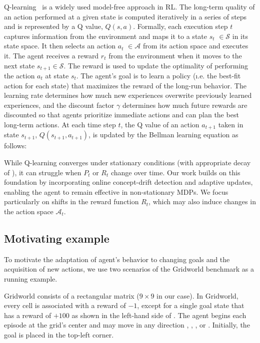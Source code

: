 Q-learning~\cite{watkins92} is a widely used model-free approach in \ac{RL}. The long-term quality of an action performed at a given state is computed iteratively in a series of steps and is represented by a Q value,
$\mathit{Q(s,a)}$.
Formally, each execution step $t$ captures information from the environment and maps it to a state
{\color{purple}$s_t$} $\in \mathcal{S}$ in its state space. It then selects an
action {\color{purple}$a_t$} $\in \mathcal{A}$ from its action space and executes it. The agent
receives a reward {\color{Bittersweet}$r_t$} from the environment when it moves to the next state
$s_{t+1} \in \mathcal{S}$. The reward is used to update the optimality of performing the
action {\color{Mulberry}$a_t$} at state {\color{purple}$s_t$}. The agent's goal is to learn
a policy (\i.e. the best-fit action for each state) that maximizes the reward of the
long-run behavior. The learning rate \lrate{\alpha} determines how much new experiences 
overwrite previously learned experiences, and the discount factor {\color{RoyalBlue} $\gamma$} 
determines how much future rewards are discounted so that agents prioritize immediate actions and 
can plan the best long-term actions. At each time step $t$, the Q value of an action 
{\color{purple}$a_{t+1}$} taken in state {\color{purple}$s_{t+1}$}, $Q(s_{t+1}, a_{t+1})$, is updated by 
the Bellman learning equation as follows:

\vspace{1em}

\vspace{1em}

While Q-learning converges under stationary conditions (with appropriate decay of \lrate{\alpha}), it 
can struggle when $P_t$ or $R_t$ change over time. Our work builds on this foundation by 
incorporating online concept-drift detection and adaptive updates, enabling the agent to remain 
effective in non-stationary MDPs. We focus particularly on shifts in the reward function $R_t$, which 
may also induce changes in the action space $\mathcal{A}_t$.


\subsection{Motivating example}
\label{sec:motivation}


To motivate the adaptation of agent's behavior to changing goals and the acquisition of new actions, 
we use two scenarios of the Gridworld benchmark as a running example.

Gridworld consists of a rectangular matrix ($9\times 9$ in our case). In Gridworld, every cell is 
associated with a reward of $-1$, except for a single goal state that has a reward of $+100$ as shown 
in the left-hand side of . The agent begins each episode at the grid's center and may 
move in any direction , , , or . Initially, the goal is placed in the 
top-left corner.  

